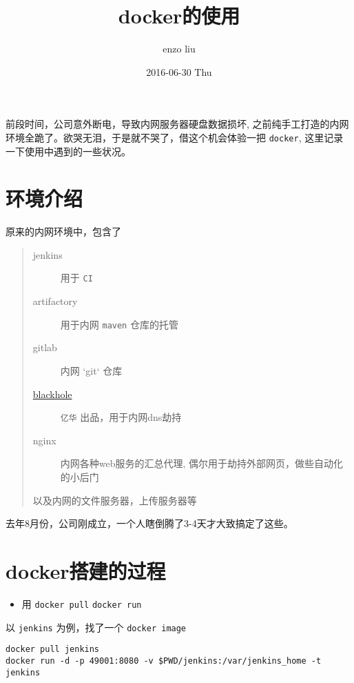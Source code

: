 \documentclass[11pt,a4paper]{article}
\author{enzo liu}
\date{2016-06-30 Thu}
\title{docker的使用}
\begin{document}
\maketitle
前段时间，公司意外断电，导致内网服务器硬盘数据损坏, 之前纯手工打造的内网环境全跪了。欲哭无泪，于是就不哭了，借这个机会体验一把 \verb~docker~, 这里记录一下使用中遇到的一些状况。

\section*{环境介绍}
\label{sec-1}

原来的内网环境中，包含了

\begin{quote}


\begin{description}
\item[{jenkins}] 用于 \verb~CI~
\item[{artifactory}] 用于内网 \verb~maven~ 仓库的托管
\item[{gitlab}] 内网 `git` 仓库
\item[{\href{https://github.com/code4craft/blackhole}{blackhole}}] \verb~亿华~ 出品，用于内网dns劫持
\item[{nginx}] 内网各种web服务的汇总代理, 偶尔用于劫持外部网页，做些自动化的小后门
\end{description}

以及内网的文件服务器，上传服务器等
\end{quote}

去年8月份，公司刚成立，一个人瞎倒腾了3-4天才大致搞定了这些。

\section*{docker搭建的过程}
\label{sec-2}

\begin{itemize}
\item 用 \verb~docker pull~ \verb~docker run~
\end{itemize}

以 \verb~jenkins~ 为例，找了一个 \verb~docker image~
\begin{lstlisting}
docker pull jenkins
docker run -d -p 49001:8080 -v $PWD/jenkins:/var/jenkins_home -t jenkins
\end{lstlisting}
\end{document}
